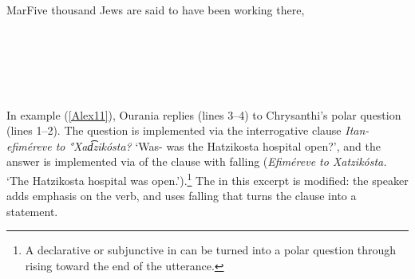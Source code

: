 \documentclass[output=paper]{LSP/langsci}
\begin{document}
\begin{Transcript}[FS {>}{>\hspace{0.1in}}]{Mar}{Five thousand Jews are said to have been working there,}%
\label{Alex10}%
\\
\\		
\\
 \\
\\
  \\ 
\end{Transcript}

In example (\ref{Alex11}), Ourania replies (lines 3--4) to Chrysanthi’s polar question (lines 1--2). The question is implemented via the interrogative clause \textit{Itan- efiméreve to °Xad͡zikósta?} `Was- was the Hatzikosta hospital open?', and the answer is implemented via  of the clause with falling  (\textit{Efiméreve to Xatzikósta.} `The Hatzikosta hospital was open.').\footnote{A declarative or subjunctive  in  can be turned into a polar question through rising  toward the end of the utterance.} The  in this excerpt is modified: the speaker adds emphasis on the verb, and uses falling  that turns the clause into a statement. 
\end{document}
